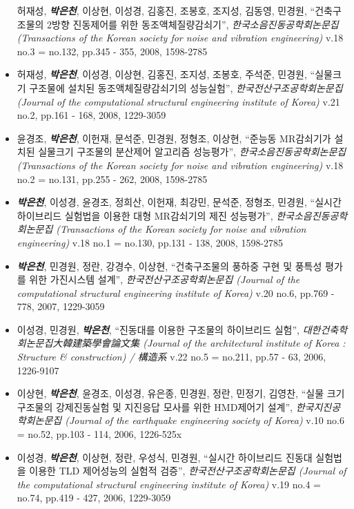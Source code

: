 \documentclass[]{article}
\begin{document}
\begin{itemize}
  허재성, \emph{\textbf{박은천}}, 이상현, 이성경, 김홍진, 조봉호, 조지성,
  김동영, 민경원, ``건축구조물의 2방향 진동제어를 위한
  동조액체질량감쇠기'', \emph{한국소음진동공학회논문집 (Transactions of
  the Korean society for noise and vibration engineering)} v.18 no.3 =
  no.132, pp.345 - 355, 2008, 1598-2785
\item
  허재성, \emph{\textbf{박은천}}, 이성경, 이상현, 김홍진, 조지성, 조봉호,
  주석준, 민경원, ``실물크기 구조물에 설치된 동조액체질량감쇠기의
  성능실험'', \emph{한국전산구조공학회논문집 (Journal of the
  computational structural engineering institute of Korea)} v.21 no.2,
  pp.161 - 168, 2008, 1229-3059
\item
  윤경조, \emph{\textbf{박은천}}, 이헌재, 문석준, 민경원, 정형조, 이상현,
  ``준능동 MR감쇠기가 설치된 실물크기 구조물의 분산제어 알고리즘
  성능평가'', \emph{한국소음진동공학회논문집 (Transactions of the Korean
  society for noise and vibration engineering)} v.18 no.2 = no.131,
  pp.255 - 262, 2008, 1598-2785
\item
  \emph{\textbf{박은천}}, 이성경, 윤경조, 정희산, 이헌재, 최강민, 문석준,
  정형조, 민경원, ``실시간 하이브리드 실험법을 이용한 대형 MR감쇠기의
  제진 성능평가'', \emph{한국소음진동공학회논문집 (Transactions of the
  Korean society for noise and vibration engineering)} v.18 no.1 =
  no.130, pp.131 - 138, 2008, 1598-2785
\item
  \emph{\textbf{박은천}}, 민경원, 정란, 강경수, 이상현, ``건축구조물의 풍하중
  구현 및 풍특성 평가를 위한 가진시스템 설계'',
  \emph{한국전산구조공학회논문집 (Journal of the computational
  structural engineering institute of Korea)} v.20 no.6, pp.769 - 778,
  2007, 1229-3059
\item
  이성경, 민경원, \emph{\textbf{박은천}}, ``진동대를 이용한 구조물의 하이브리드
  실험'', \emph{대한건축학회논문집大韓建築學會論文集 (Journal of the
  architectural institute of Korea : Structure \& construction) /
  構造系} v.22 no.5 = no.211, pp.57 - 63, 2006, 1226-9107
\item
  이상현, \emph{\textbf{박은천}}, 윤경조, 이성경, 유은종, 민경원, 정란, 민정기,
  김영찬, ``실물 크기 구조물의 강제진동실험 및 지진응답 모사를 위한
  HMD제어기 설계'', \emph{한국지진공학회논문집 (Journal of the
  earthquake engineering society of Korea)} v.10 no.6 = no.52, pp.103 -
  114, 2006, 1226-525x
\item
  이성경, \emph{\textbf{박은천}}, 이상현, 정란, 우성식, 민경원, ``실시간
  하이브리드 진동대 실험법을 이용한 TLD 제어성능의 실험적 검증'',
  \emph{한국전산구조공학회논문집 (Journal of the computational
  structural engineering institute of Korea)} v.19 no.4 = no.74, pp.419
  - 427, 2006, 1229-3059
\end{itemize}
\end{document}
